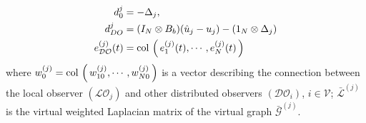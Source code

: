 \documentclass{ifacconf}
\def\col#1{\mathop{{\rm col}\,\left(\,#1\,\right)}}
\def\V{\mathcal{V}} %
\def\G{\mathcal{G}} %
\def\W{\mathcal{W}} %
\def\L{\mathcal{L}} %
\def\LO{\mathcal{LO}} %
\def\DO{\mathcal{DO}} %
\def\diag#1{\mathop{{\rm diag}\,\left(\,#1\,\right)}}
\newtheorem{assumption}{\it \textbf{Assumption}}%
\begin{document}
\begin{align*}
    d^j_0 &= - \Delta_j, \\
    d^j_{DO}  &= (I_N \otimes B_b)( \hat {u}_j- {u}_j)  - (1_N \otimes \Delta_j) \\
    e_{\DO}^{(j)}(t) &= \col{e_1^{(j)}(t), \cdots , e_N^{(j)}(t)}
\end{align*}
%
where 
$w_{0}^{(j)} = \col{w_{10}^{(j)}, \cdots, w_{N0}^{(j)}} $ is a vector describing the connection between the local observer $(\LO_{j})$ and other distributed observers $(\DO_{i})$, $i \in \V$; $\bar{\L}^{(j)}$ is the virtual weighted Laplacian matrix of the virtual graph $\bar{\G}^{(j)}$. 

\end{document}
